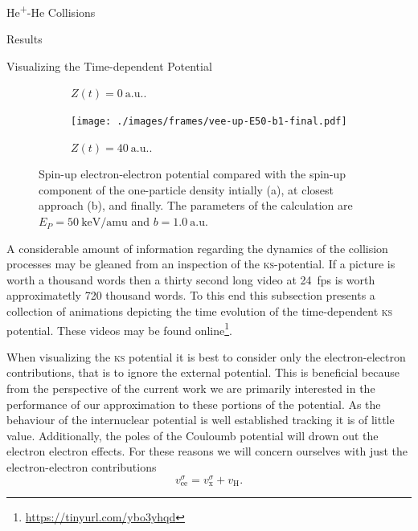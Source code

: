 \documentclass[a5paper, 9 pt]{extreport}
\begin{document}
\begin{chapter}{\texorpdfstring{He\textsuperscript{+}}{He+}-He Collisions \label{chap:hephe}}
\begin{section}{Results \label{sec:hephe-disc}}
\begin{subsection}{Visualizing the Time-dependent Potential \label{sec:visual}}
\begin{figure}[t]
\begin{subfigure}{.49\textwidth}
               \caption{$Z(t) = 0~\mathrm{a.u.}$. \label{fig:upC}}
            \end{subfigure}
            \begin{subfigure}{.49\textwidth}
               \centering
               \texttt{[image: ./images/frames/vee-up-E50-b1-final.pdf]}
               \caption{$Z(t) = 40~\mathrm{a.u.}$. \label{fig:upF}}
            \end{subfigure}
            \caption[Spin-up electron-electron potential]
                    {Spin-up electron-electron potential compared with the spin-up component of the
                    one-particle density intially (a), at closest approach (b), and finally.
                    The parameters of the calculation are $E_P = 50~\mathrm{keV/amu}$ and
                    $b = 1.0~\mathrm{a.u.}$ \label{fig:upPlots}}
         \end{figure}

         A considerable amount of information regarding the dynamics of the collision processes may be
         gleaned from an inspection of the \textsc{ks}-potential. If a picture is worth a thousand words
         then a thirty second long video at 24~fps is worth approximatetly 720 thousand words. To this
         end this subsection presents a collection of animations depicting the time evolution of the
         time-dependent \textsc{ks} potential. These videos may be found
         online\footnote{\url{https://tinyurl.com/ybo3yhqd}}.

         When visualizing the \textsc{ks} potential it is best to consider only the electron-electron
         contributions, that is to ignore the external potential. This is beneficial because from the
         perspective of the current work we are primarily interested in the performance of our
         approximation to these portions of the potential. As the behaviour of the internuclear potential
         is well established tracking it is of little value. Additionally, the poles of the Couloumb
         potential will drown out the electron electron effects. For these reasons we will concern
         ourselves with just the electron-electron contributions
         \begin{equation}
            v_\mathrm{ee}^\sigma = v_\mathrm{x}^\sigma + v_\mathrm{H}.
         \end{equation}


\end{subsection}
\end{section}
\end{chapter}
\end{document}
